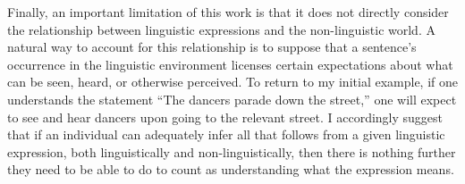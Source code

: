 Finally, an important limitation of this work is that it does not directly consider the relationship between linguistic expressions and the non-linguistic world. A natural way to account for this relationship is to suppose that a sentence's occurrence in the linguistic environment licenses certain expectations about what can be seen, heard, or otherwise perceived. To return to my initial example, if one understands the statement ``The dancers parade down the street,'' one will expect to see and hear dancers upon going to the relevant street. I accordingly suggest that if an individual can adequately infer all that follows from a given linguistic expression, both linguistically and non-linguistically, then there is nothing further they need to be able to do to count as understanding what the expression means.

